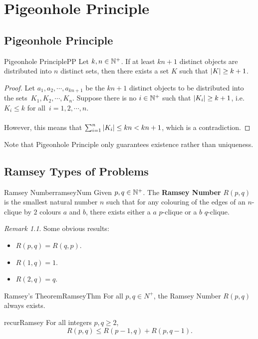 \documentclass[math]{amznotes}
\theoremstyle{remark}
\newtheorem*{remark}{Remark}
\begin{document}
\chapter{Pigeonhole Principle}
\section{Pigeonhole Principle}
\begin{thmbox}{Pigeonhole Principle}{PP}
    Let $k, n \in \mathbb{N}^+$. If at least $kn + 1$ distinct objects are distributed into $n$ distinct sets, then there exists a set $K$ such that ${\left\lvert {K} \right\rvert} \geq k + 1$.
    \tcblower   
    \begin{proof}
        Let $a_1, a_2, \cdots, a_{kn + 1}$ be the $kn + 1$ distinct objects to be distributed into the sets~$K_1, K_2, \cdots, K_n$. Suppose there is no $i \in \mathbb{N}^+$ such that ${\left\lvert {K_i} \right\rvert} \geq k + 1$, i.e. $K_i \leq k$ for all~$i = 1, 2, \cdots, n$.
        \\\\
        However, this means that $\sum_{i = 1}^{n}{\left\lvert {K_i} \right\rvert} \leq kn < kn + 1$, which is a contradiction.
    \end{proof}
\end{thmbox}
Note that Pigeonhole Principle only guarantees existence rather than uniqueness.
\section{Ramsey Types of Problems}
\begin{dfnbox}{Ramsey Number}{ramseyNum}
    Given $p, q \in \mathbb{N}^+$. The {\color{red} \textbf{Ramsey Number}} $R(p, q)$ is the smallest natural number $n$ such that for any colouring of the edges of an $n$-clique by $2$ colours $a$ and $b$, there exists either a $a$ $p$-clique or a $b$ $q$-clique.
\end{dfnbox}
\begin{notebox}
    \begin{remark}
        Some obvious results:
        \begin{itemize}
            \item $R(p, q) = R(q, p)$.
            \item $R(1, q) = 1$.
            \item $R(2, q) = q$.
        \end{itemize}
    \end{remark}
\end{notebox}
\begin{thmbox}{Ramsey's Theorem}{RamseyThm}
    For all $p, q \in N^+$, the Ramsey Number $R(p, q)$ always exists.
\end{thmbox}
\begin{thmbox}{}{recurRamsey}
    For all integers $p, q \geq 2$,
    \begin{equation*}
        R(p, q) \leq R(p - 1, q) + R(p, q - 1).
    \end{equation*}
\end{thmbox}
\end{document}
